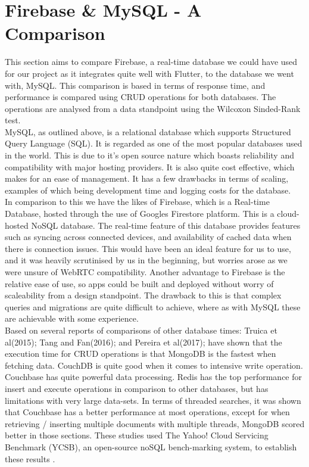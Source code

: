 \section{Firebase \& MySQL - A Comparison}
This section aims to compare Firebase, a real-time database we could have used for our project as it integrates quite well with Flutter, to the database we went with, MySQL. This comparison is based in terms of response time, and performance is compared using CRUD operations for both databases. The operations are analysed from a data standpoint using the Wilcoxon Sinded-Rank test.
\\ MySQL, as outlined above, is a relational database which supports Structured Query Language (SQL). It is regarded as one of the most popular databases used in the world. This is due to it’s open source nature which boasts reliability and compatibility with major hosting providers. It is also quite cost effective, which makes for an ease of management. It has a few drawbacks in terms of scaling, examples of which being development time and logging costs for the database.
\\ In comparison to this we have the likes of Firebase, which is a Real-time Database, hosted through the use of Googles Firestore platform. This is a cloud-hosted NoSQL database. The real-time feature of this database provides features such as syncing across connected devices, and availability of cached data when there is connection issues. This would have been an ideal feature for us to use, and it was heavily scrutinised by us in the beginning, but worries arose as we were unsure of WebRTC compatibility. Another advantage to Firebase is the relative ease of use, so apps could be built and deployed without worry of scaleability from a design standpoint. The drawback to this is that complex queries and migrations are quite difficult to achieve, where as with MySQL these are achievable with some experience.
\\ Based on several reports of comparisons of other database times: Truica et al(2015)\cite{truica2015performance}; Tang and Fan(2016)\cite{tang2016performance}; and Pereira et al(2017)\cite{pereira2018nosql}; have shown that the execution time for CRUD operations is that MongoDB is the fastest when fetching data. CouchDB is quite good when it comes to intensive write operation. Couchbase has quite powerful data processing. Redis has the top performance for insert and execute operations in comparison to other databases, but has limitations with very large data-sets. In terms of threaded searches, it was shown that Couchbase has a better performance at most operations, except for when retrieving / inserting multiple documents with multiple threads, MongoDB scored better in those sections. These studies used The Yahoo! Cloud Servicing Benchmark (YCSB), an open-source noSQL bench-marking system, to establish these results \cite{OHYVER2019396}.
